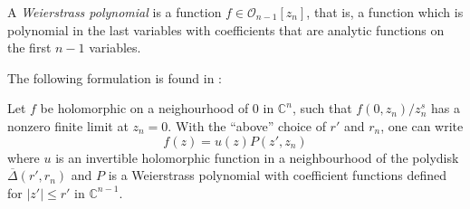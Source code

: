 \begin{definition}
\label{definition-weierstrass-polynomial}
A {\it Weierstrass polynomial} is a function $f \in \mathcal{O}_{n-1}[z_n]$,
that is, a function which is polynomial in the last variables with coefficients
that are analytic functions on the first $n-1$ variables.
\end{definition}

\noindent
The following formulation is found in \cite{Demailly}:

\begin{theorem}
\label{theorem-weierstrass-preparation-theorem}
Let $f$ be holomorphic on a neighourhood of $0$ in $\mathbb{C}^n$,
such that $f(0,z_n)/z_n^s$ has a nonzero finite limit at $z_n=0$.
With the ``above'' choice of $r'$ and $r_n$,
one can write 
$$
f(z)=u(z)P(z',z_n)
$$
where $u$ is an invertible holomorphic function
in a neighbourhood of the polydisk $\overline{\Delta}(r',r_n)$ 
and $P$ is a Weierstrass polynomial with coefficient
functions defined for $|z'|\leq r'$ in $\mathbb{C}^{n-1}$.
\end{theorem}

